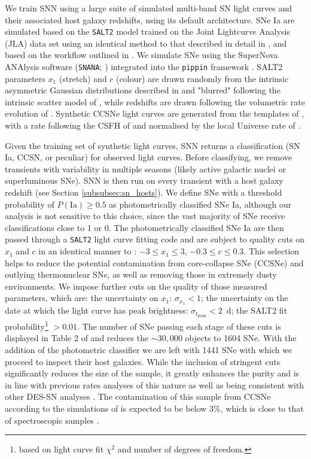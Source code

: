 \documentclass[fleqn,usenatbib]{mnras}
\begin{document}
We train SNN using a large suite of simulated multi-band SN light curves and their associated host galaxy redshifts, using its default architecture. SNe Ia are simulated based on the \texttt{SALT2} model \citep{Guy2007} trained on the Joint Lightcurve Analysis (JLA) data set \citep{Betoule2014} using an identical method to that described in detail in \citet{Vincenzi2020}, and based on the workflow outlined in \citet{Kessler2019}. We simulate SNe using the SuperNova ANAlysis software (\texttt{SNANA}; \citealt{Kessler2009a}) integrated into the \texttt{pippin} framework \citep{Hinton2020}. SALT2 parameters $x_1$ (stretch) and $c$ (colour) are drawn randomly from the intrinsic asymmetric Gaussian distributions described in \citet{Scolnic2016} and "blurred" following the intrinsic scatter model of \citet{Guy2010}, while redshifts are drawn following the volumetric rate evolution of \citet{Frohmaier2019}. Synthetic CCSNe light curves are generated from the templates of \citet{Vincenzi2019}, with a rate following the CSFH of \citet{Madau2014} and normalised by the local Universe rate of \citet{Frohmaier2020}. 

Given the training set of synthetic light curves, SNN returns a classification (SN Ia, CCSN, or peculiar) for observed light curves. Before classifying, we remove transients with variability in multiple seasons (likely active galactic nuclei or superluminous SNe). SNN is then run on every transient with a host galaxy redshift (see Section \ref{subsubsec:sn_hosts}). We define SNe with a threshold probability of $P(\mathrm{Ia})\geq0.5$ as photometrically classified SNe Ia, although our analysis is not sensitive to this choice, since the vast majority of SNe receive classifications close to 1 or 0. The photometrically classified SNe Ia are then passed through a \texttt{SALT2} light curve fitting code and are subject to quality cuts on $x_1$ and $c$ in an identical manner to \citet{Vincenzi2020}: $-3 \leq x_1 \leq 3$, $-0.3 \leq c \leq 0.3$. This selection helps to reduce the potential contamination from core-collapse SNe (CCSNe) and outlying thermonuclear SNe, as well as removing those in extremely dusty environments. We impose further cuts on the quality of those measured parameters, which are: the uncertainty on $x_1$: $\sigma_{x_1} <1$; the uncertainty on the date at which the light curve has peak brightness: $\sigma_{t_{\mathrm{peak}}} <2$~d; the SALT2 fit probability\footnote{based on light curve fit $\chi^2$ and number of degrees of freedom.} $>0.01$. The number of SNe passing each stage of these cuts is displayed in Table 2 of \citet{Vincenzi2020} and reduces the $\sim30,000$ objects to 1604 SNe. With the addition of the photometric classifier we are left with 1441 SNe with which we proceed to inspect their host galaxies. While the inclusion of stringent cuts significantly reduces the size of the sample, it greatly enhances the purity and is in line with previous rates analyses of this nature \citep{Sullivan2006} as well as being consistent with other DES-SN analyses \citep[e.g.][]{Kelsey2021}. The contamination of this sample from CCSNe according to the simulations of \citet{Vincenzi2020} is expected to be below 3\%, which is close to that of spectroscopic samples \citep{Rubin2015}.
\end{document}
